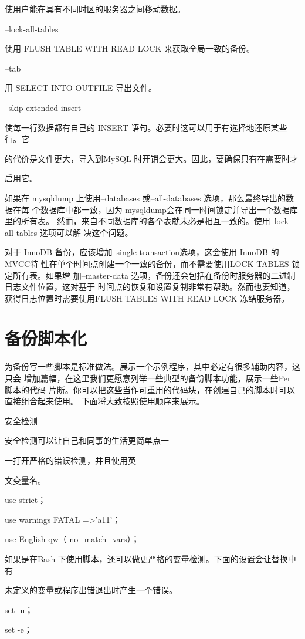 使用户能在具有不同时区的服务器之间移动数据。

--lock-all-tables

使用 FLUSH TABLE WITH READ LOCK 来获取全局一致的备份。

--tab

用 SELECT INTO OUTFILE 导出文件。

--skip-extended-insert

使每一行数据都有自己的 INSERT 语句。必要时这可以用于有选择地还原某些行。它

的代价是文件更大，导入到MySQL 时开销会更大。因此，要确保只有在需要时才

启用它。

如果在 mysqldump 上使用--databases 或--all-databases 选项，那么最终导出的数据在每
个数据库中都一致，因为 mysqldump会在同一时间锁定并导出一个数据库里的所有表。
然而，来自不同数据库的各个表就未必是相互一致的。使用--lock-all-tables 选项可以解
决这个问题。

对于 InnoDB 备份，应该增加--single-transaction选项，这会使用 InnoDB 的MVCC特
性在单个时间点创建一个一致的备份，而不需要使用LOCK TABLES 锁定所有表。如果增
加--master-data 选项，备份还会包括在备份时服务器的二进制日志文件位置，这对基于
时间点的恢复和设置复制非常有帮助。然而也要知道，获得日志位置时需要使用FLUSH
TABLES WITH READ LOCK 冻结服务器。

\section{备份脚本化}
为备份写一些脚本是标准做法。展示一个示例程序，其中必定有很多辅助内容，这只会
增加篇幅，在这里我们更愿意列举一些典型的备份脚本功能，展示一些Perl脚本的代码
片断。你可以把这些当作可重用的代码块，在创建自己的脚本时可以直接组合起来使用。
下面将大致按照使用顺序来展示。

安全检测

安全检测可以让自己和同事的生活更简单点一

一打开严格的错误检测，并且使用英

文变量名。

use strict；

use warnings FATAL =>'a11'；

use English qw（-no\_match\_vars）；

如果是在Bash 下使用脚本，还可以做更严格的变量检测。下面的设置会让替换中有

未定义的变量或程序出错退出时产生一个错误。

set -u；

set -e；

